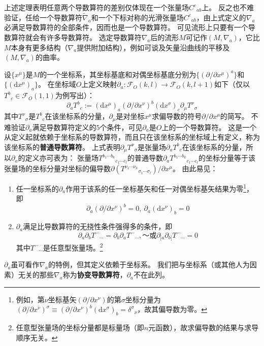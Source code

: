 上述定理表明任意两个导数算符的差别仅体现在一个张量场$C^c{}_{ab}$上。
反之也不难验证，任给一个导数算符$\tilde\nabla_a$和一个下标对称的光滑张量场$C^c{}_{ab}$，由上式定义的$\nabla_a$必满足导数算符的全部条件，因而也是一个导数算符。
可见流形上只要有一个导数算符就会有许多导数算符。
选定导数算符$\nabla_a$后的流形$M$可记作$(M, \nabla_a)$，它比$M$本身有更多结构（$\nabla_a$提供附加结构），例如可谈及矢量沿曲线的平移及$(M, \nabla_a)$的曲率。

设$\{x^\mu\}$是$M$的一个坐标系，其坐标基底和对偶坐标基底分别为$\{(\partial / \partial x^\mu)^a\}$和$\{(\mathrm{d}x^\mu)_a\}$。
在坐标域$O$上定义映射$\partial_a \colon \mathscr{F}_O(k, l) \to \mathscr{F}_O(k, l + 1)$如下（仅以$T^b{}_c \in \mathscr{F}_O(1, 1)$为例写出）：
$$\partial_aT^b{}_c := (\mathrm{d}x^\mu)_a(\partial / \partial x^\nu)^b(\mathrm{d}x^\sigma)_c\partial_\mu T^\nu{}_\sigma$$
其中$T^\nu{}_\sigma$是$T^b{}_c$在该坐标系的分量，$\partial_\mu$是对坐标$x^\mu$求偏导数的符号$\partial / \partial x^\mu$的简写。
不难验证$\partial_a$满足导数算符定义的$5$个条件，可见$\partial_a$是$O$上的一个导数算符。
这是一个从定义起就依赖于坐标系的导数算符，而且只在该坐标系的坐标域上有定义，称为该坐标系的\textbf{普通导数算符}。
上式表明$\partial_\mu T^\nu{}_\sigma$是张量场$\partial_aT^b{}_c$在该坐标系的分量，所以$\partial_a$的定义亦可表为：
张量场$T^{b_1 \cdots b_k}{}_{c_1 \cdots c_l}$的普通导数$\partial_aT^{b_1 \cdots b_k}{}_{c_1 \cdots c_l}$的坐标分量等于该张量场的坐标分量对坐标的偏导数$\partial(T^{\nu_1 \cdots \nu_k}{}_{\sigma_1 \cdots \sigma_l}) / \partial x^\mu$。
由此易见：

\begin{enumerate}[（1）]
\item 任一坐标系的$\partial_a$作用于该系的任一坐标基矢和任一对偶坐标基矢结果为零\footnote{
例如，第$\nu$坐标基矢$(\partial / \partial x^\nu)$的第$\sigma$坐标分量为$(\partial / \partial x^\nu)^\sigma \equiv (\partial / \partial x^\nu)^b(\mathrm{d}x^\sigma)_b = \delta^\sigma{}_\nu$，故其偏导数为零。
}，即
$$\partial_a(\partial / \partial x^\nu)^b = 0, ~ \partial_a(\mathrm{d}x^\nu)_b = 0$$
\item $\partial_a$满足比导数算符的无挠性条件强得多的条件，即
$$\partial_a\partial_bT^{\cdots}{}_{\cdots} = \partial_b\partial_aT^{\cdots}{}_{\cdots}, ～ \text{或} \partial_{[a}\partial_{b]}T^{\cdots}{}_{\cdots} = 0$$
其中$T^{\cdots}{}_{\cdots}$是任意型张量场。\footnote{
任意型张量场的坐标分量都是标量场（即$n$元函数），故求偏导数的结果与求导顺序无关。
}
\end{enumerate}

$\partial_a$虽可看作$\nabla_a$的特例，但其定义依赖于坐标系。
我们把与坐标系（或其他人为因素）无关的那些$\nabla_a$称为\textbf{协变导数算符}，$\partial_a$不在此列。

